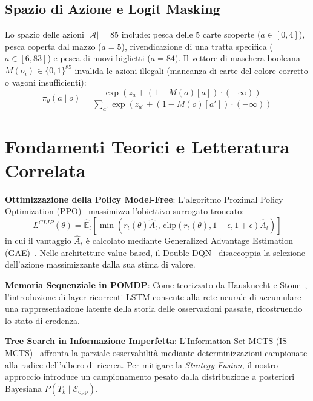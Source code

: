 \documentclass[11pt,a4paper]{article}
\begin{document}
\subsection{Spazio di Azione e Logit Masking}
Lo spazio delle azioni $|\mathcal{A}| = 85$ include: pesca delle 5 carte scoperte ($a \in [0,4]$), pesca coperta dal mazzo ($a=5$), rivendicazione di una tratta specifica ($a \in [6,83]$) e pesca di nuovi biglietti ($a=84$). Il vettore di maschera booleana $M(o_i) \in \{0, 1\}^{85}$ invalida le azioni illegali (mancanza di carte del colore corretto o vagoni insufficienti):
\begin{equation}
\tilde{\pi}_\theta(a \mid o) = \frac{\exp\left(z_a + (1 - M(o)[a]) \cdot (-\infty)\right)}{\sum_{a'} \exp\left(z_{a'} + (1 - M(o)[a']) \cdot (-\infty)\right)}
\end{equation}

\section{Fondamenti Teorici e Letteratura Correlata}
\label{sec:letteratura}
\textbf{Ottimizzazione della Policy Model-Free}: L'algoritmo Proximal Policy Optimization (PPO)~\cite{schulman2017proximal} massimizza l'obiettivo surrogato troncato:
\begin{equation}
L^{CLIP}(\theta) = \hat{\mathbb{E}}_t \left[ \min\left(r_t(\theta)\hat{A}_t, \, \text{clip}(r_t(\theta), 1-\epsilon, 1+\epsilon)\hat{A}_t\right) \right]
\end{equation}
in cui il vantaggio $\hat{A}_t$ è calcolato mediante Generalized Advantage Estimation (GAE)~\cite{schulman2015high}. Nelle architetture value-based, il Double-DQN~\cite{mnih2015human, vanhasselt2016deep} disaccoppia la selezione dell'azione massimizzante dalla sua stima di valore.

\textbf{Memoria Sequenziale in POMDP}: Come teorizzato da Hausknecht e Stone~\cite{hausknecht2015deep}, l'introduzione di layer ricorrenti LSTM consente alla rete neurale di accumulare una rappresentazione latente della storia delle osservazioni passate, ricostruendo lo stato di credenza.

\textbf{Tree Search in Informazione Imperfetta}: L'Information-Set MCTS (IS-MCTS)~\cite{cowling2012information} affronta la parziale osservabilità mediante determinizzazioni campionate alla radice dell'albero di ricerca. Per mitigare la \textit{Strategy Fusion}, il nostro approccio introduce un campionamento pesato dalla distribuzione a posteriori Bayesiana $P(T_k \mid \mathcal{E}_{\text{opp}})$.
\end{document}
